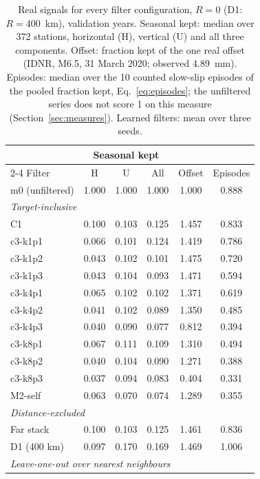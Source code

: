 \documentclass[preprint,12pt,authoryear]{elsarticle}
\begin{document}
\begin{table}[tbp]
  \centering
  \scriptsize\renewcommand{\arraystretch}{0.95}
  \caption{Real signals for every filter configuration, $R = 0$ (D1: $R = 400$~km), validation years. Seasonal kept: median over 372 stations, horizontal (H), vertical (U) and all three components. Offset: fraction kept of the one real offset (IDNR, M6.5, 31 March 2020; observed 4.89~mm). Episodes: median over the 10 counted slow-slip episodes of the pooled fraction kept, Eq.~\eqref{eq:episodes}; the unfiltered series does not score 1 on this measure (Section~\ref{sec:measures}). Learned filters: mean over three seeds.}
  \label{tab:results-real}
  \setlength{\tabcolsep}{5pt}
  \begin{tabular}{lccccc}
    \toprule
    & \multicolumn{3}{c}{Seasonal kept} & & \\
    \cmidrule(lr){2-4}
    Filter & H & U & All & Offset & Episodes \\
    \midrule
    m0 (unfiltered) & 1.000 & 1.000 & 1.000 & 1.000 & 0.888 \\
    \multicolumn{6}{l}{\textit{Target-inclusive}} \\
    C1 & 0.100 & 0.103 & 0.125 & 1.457 & 0.833 \\
    c3-k1p1 & 0.066 & 0.101 & 0.124 & 1.419 & 0.786 \\
    c3-k1p2 & 0.043 & 0.102 & 0.101 & 1.475 & 0.720 \\
    c3-k1p3 & 0.043 & 0.104 & 0.093 & 1.471 & 0.594 \\
    c3-k4p1 & 0.065 & 0.102 & 0.102 & 1.371 & 0.619 \\
    c3-k4p2 & 0.041 & 0.102 & 0.089 & 1.350 & 0.485 \\
    c3-k4p3 & 0.040 & 0.090 & 0.077 & 0.812 & 0.394 \\
    c3-k8p1 & 0.067 & 0.111 & 0.109 & 1.310 & 0.494 \\
    c3-k8p2 & 0.040 & 0.104 & 0.090 & 1.271 & 0.388 \\
    c3-k8p3 & 0.037 & 0.094 & 0.083 & 0.404 & 0.331 \\
    M2-self & 0.063 & 0.070 & 0.074 & 1.289 & 0.355 \\
    \multicolumn{6}{l}{\textit{Distance-excluded}} \\
    Far stack & 0.100 & 0.103 & 0.125 & 1.461 & 0.836 \\
    D1 (400 km) & 0.097 & 0.170 & 0.169 & 1.469 & 1.006 \\
    \multicolumn{6}{l}{\textit{Leave-one-out over nearest neighbours}} \\

\end{tabular}
\end{table}
\end{document}
